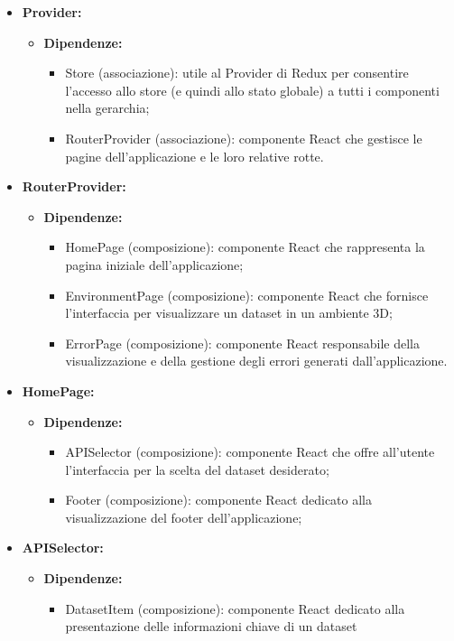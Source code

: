 \begin{itemize}
    \item \textbf{Provider:}
    \begin{itemize}
        \item \textbf{Dipendenze:}
        \begin{itemize}
            \item Store (associazione): utile al Provider di Redux per consentire l'accesso allo store (e quindi allo stato globale) a tutti i componenti nella gerarchia;
            \item RouterProvider (associazione): componente React che gestisce le pagine dell'applicazione e le loro relative rotte.
        \end{itemize} 
    \end{itemize}

    \item \textbf{RouterProvider:}
    \begin{itemize}
        \item \textbf{Dipendenze:}
        \begin{itemize}
            \item HomePage (composizione): componente React che rappresenta la pagina iniziale dell'applicazione;
            \item EnvironmentPage (composizione): componente React che fornisce l'interfaccia per visualizzare un dataset in un ambiente 3D;
            \item ErrorPage (composizione): componente React responsabile della visualizzazione e della gestione degli errori generati dall'applicazione.
        \end{itemize} 
    \end{itemize}

    \item \textbf{HomePage:}
    \begin{itemize}
        \item \textbf{Dipendenze:}
        \begin{itemize}
            \item APISelector (composizione): componente React che offre all'utente l'interfaccia per la scelta del dataset desiderato;
            \item Footer (composizione): componente React dedicato alla visualizzazione del footer dell'applicazione;
        \end{itemize} 
    \end{itemize}

    \item \textbf{APISelector:}
    \begin{itemize}
        \item \textbf{Dipendenze:}
        \begin{itemize}
            \item DatasetItem (composizione): componente React dedicato alla presentazione delle informazioni chiave di un dataset
        \end{itemize} 
    \end{itemize}
\end{itemize}

